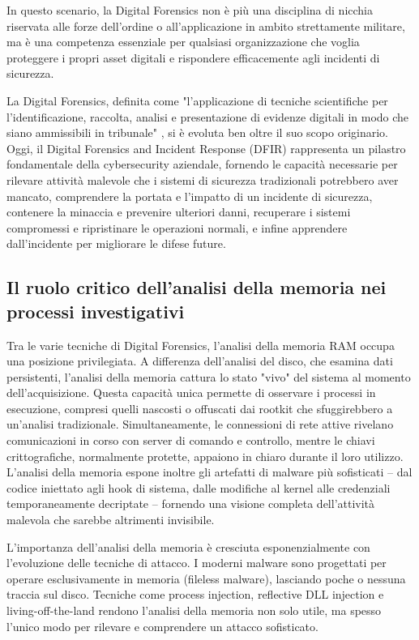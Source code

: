 In questo scenario, la Digital Forensics non è più una disciplina di nicchia riservata alle forze dell'ordine o all'applicazione in ambito strettamente militare, ma è una competenza essenziale per qualsiasi organizzazione che voglia proteggere i propri asset digitali e rispondere efficacemente agli incidenti di sicurezza.

La Digital Forensics, definita come "l'applicazione di tecniche scientifiche per l'identificazione, raccolta, analisi e presentazione di evidenze digitali in modo che siano ammissibili in tribunale" \cite{palmer2001}, si è evoluta ben oltre il suo scopo originario. Oggi, il Digital Forensics and Incident Response (DFIR) rappresenta un pilastro fondamentale della cybersecurity aziendale, fornendo le capacità necessarie per rilevare attività malevole che i sistemi di sicurezza tradizionali potrebbero aver mancato, comprendere la portata e l'impatto di un incidente di sicurezza, contenere la minaccia e prevenire ulteriori danni, recuperare i sistemi compromessi e ripristinare le operazioni normali, e infine apprendere dall'incidente per migliorare le difese future.

\subsection{Il ruolo critico dell'analisi della memoria nei processi investigativi}

Tra le varie tecniche di Digital Forensics, l'analisi della memoria RAM occupa una posizione privilegiata. A differenza dell'analisi del disco, che esamina dati persistenti, l'analisi della memoria cattura lo stato "vivo" del sistema al momento dell'acquisizione. Questa capacità unica permette di osservare i processi in esecuzione, compresi quelli nascosti o offuscati dai rootkit che sfuggirebbero a un'analisi tradizionale. Simultaneamente, le connessioni di rete attive rivelano comunicazioni in corso con server di comando e controllo, mentre le chiavi crittografiche, normalmente protette, appaiono in chiaro durante il loro utilizzo. L'analisi della memoria espone inoltre gli artefatti di malware più sofisticati – dal codice iniettato agli hook di sistema, dalle modifiche al kernel alle credenziali temporaneamente decriptate – fornendo una visione completa dell'attività malevola che sarebbe altrimenti invisibile.

L'importanza dell'analisi della memoria è cresciuta esponenzialmente con l'evoluzione delle tecniche di attacco. I moderni malware sono progettati per operare esclusivamente in memoria (fileless malware), lasciando poche o nessuna traccia sul disco. Tecniche come process injection, reflective DLL injection e living-off-the-land rendono l'analisi della memoria non solo utile, ma spesso l'unico modo per rilevare e comprendere un attacco sofisticato.

